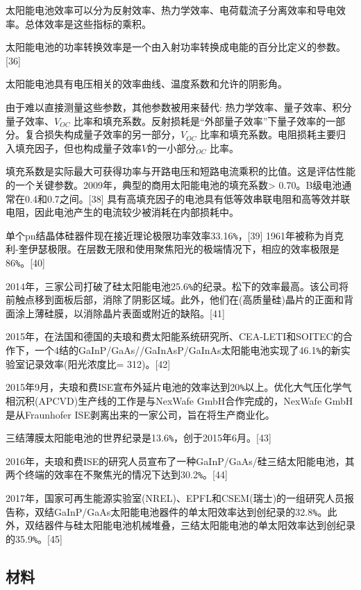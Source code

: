 太阳能电池效率可以分为反射效率、热力学效率、电荷载流子分离效率和导电效率。总体效率是这些指标的乘积。

太阳能电池的功率转换效率是一个由入射功率转换成电能的百分比定义的参数。[36]

太阳能电池具有电压相关的效率曲线、温度系数和允许的阴影角。

由于难以直接测量这些参数，其他参数被用来替代: 热力学效率、量子效率、积分量子效率、$V_{OC}$ 比率和填充系数。反射损耗是“外部量子效率”下量子效率的一部分。复合损失构成量子效率的另一部分，$V_{OC}$ 比率和填充系数。电阻损耗主要归入填充因子，但也构成量子效率$V$的一小部分$_{OC}$ 比率。

填充系数是实际最大可获得功率与开路电压和短路电流乘积的比值。这是评估性能的一个关键参数。2009年，典型的商用太阳能电池的填充系数> 0.70。B级电池通常在0.4和0.7之间。[38] 具有高填充因子的电池具有低等效串联电阻和高等效并联电阻，因此电池产生的电流较少被消耗在内部损耗中。

单个pn结晶体硅器件现在接近理论极限功率效率33.16\verb|%|，[39] 1961年被称为肖克利-奎伊瑟极限。在层数无限和使用聚焦阳光的极端情况下，相应的效率极限是86\verb|%|。[40]

2014年，三家公司打破了硅太阳能电池25.6\verb|%|的纪录。松下的效率最高。该公司将前触点移到面板后部，消除了阴影区域。此外，他们在(高质量硅)晶片的正面和背面涂上薄硅膜，以消除晶片表面或附近的缺陷。[41]

2015年，在法国和德国的夫琅和费太阳能系统研究所、CEA-LETI和SOITEC的合作下，一个4结的GaInP/GaAs//GaInAsP/GaInAs太阳能电池实现了46.1\verb|%|的新实验室记录效率(阳光浓度比= 312)。[42]

2015年9月，夫琅和费ISE宣布外延片电池的效率达到20\verb|%|以上。优化大气压化学气相沉积(APCVD)生产线的工作是与NexWafe GmbH合作完成的，NexWafe GmbH是从Fraunhofer ISE剥离出来的一家公司，旨在将生产商业化。

三结薄膜太阳能电池的世界纪录是13.6\verb|%|，创于2015年6月。[43]

2016年，夫琅和费ISE的研究人员宣布了一种GaInP/GaAs/硅三结太阳能电池，其两个终端的效率在不聚焦光的情况下达到30.2\verb|%|。[44]

2017年，国家可再生能源实验室(NREL)、EPFL和CSEM(瑞士)的一组研究人员报告称，双结GaInP/GaAs太阳能电池器件的单太阳效率达到创纪录的32.8\verb|%|。此外，双结器件与硅太阳能电池机械堆叠，三结太阳能电池的单太阳效率达到创纪录的35.9\verb|%|。[45]

\subsection{材料}

